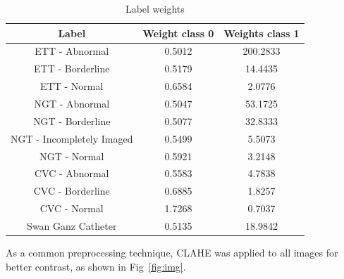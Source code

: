 \documentclass[journal, a4paper]{IEEEtran}
\begin{document}
\begin{table}[ht]
	\begin{minipage}{\linewidth}
		\centering
		\begin{tabular}{||c c c||}
			\hline
			Label                     & Weight class 0 & Weights class 1 \\ [0.5ex] \hline\hline
			ETT - Abnormal            & 0.5012         & 200.2833        \\ \hline
			ETT - Borderline          & 0.5179         & 14.4435         \\ \hline
			ETT - Normal              & 0.6584         & 2.0776          \\ \hline
			NGT - Abnormal            & 0.5047         & 53.1725         \\ \hline
			NGT - Borderline          & 0.5077         & 32.8333         \\ \hline
			NGT - Incompletely Imaged & 0.5499         & 5.5073          \\ \hline 
			NGT - Normal              & 0.5921         & 3.2148          \\ \hline
			CVC - Abnormal            & 0.5583         & 4.7838          \\ \hline
			CVC - Borderline          & 0.6885         & 1.8257          \\ \hline
			CVC - Normal              & 1.7268         & 0.7037          \\ \hline
			Swan Ganz Catheter        & 0.5135         & 18.9842         \\ [0.5ex] \hline
		\end{tabular}
		\label{tab:labelWeights}
		\caption{Label weights}
	\end{minipage}
\end{table}

As a common preprocessing technique, CLAHE \cite {CLAHE} \cite {CLAHE2} was applied to all images for better contrast, as shown in Fig~\ref{fig:img}.
\end{document}
